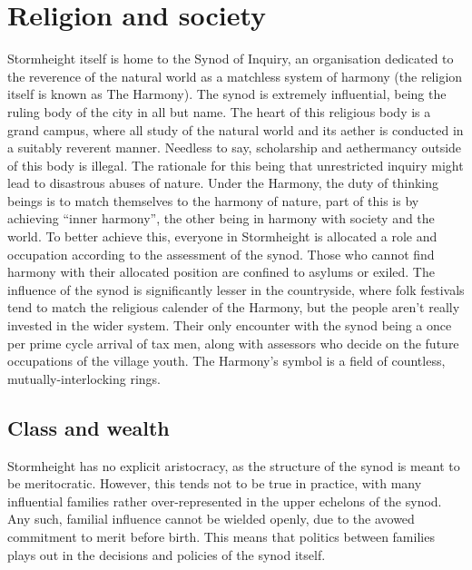 \documentclass[a4paper,11pt,oneside]{book}
\begin{document}
\section{Religion and society}
Stormheight itself is home to the Synod of Inquiry, an organisation dedicated to the reverence of the natural world as a matchless system of harmony (the religion itself is known as The Harmony). The synod is extremely influential, being the ruling body of the city in all but name. The heart of this religious body is a grand campus, where all study of the natural world and its aether is conducted in a suitably reverent manner. Needless to say, scholarship and aethermancy outside of this body is illegal. The rationale for this being that unrestricted inquiry might lead to disastrous abuses of nature. Under the Harmony, the duty of thinking beings is to match themselves to the harmony of nature, part of this is by achieving ``inner harmony'', the other being in harmony with society and the world. To better achieve this, everyone in Stormheight is allocated a role and occupation according to the assessment of the synod. Those who cannot find harmony with their allocated position are confined to asylums or exiled. The influence of the synod is significantly lesser in the countryside, where folk festivals tend to match the religious calender of the Harmony, but the people aren't really invested in the wider system. Their only encounter with the synod being a once per prime cycle arrival of tax men, along with assessors who decide on the future occupations of the village youth. The Harmony's symbol is a field of countless, mutually-interlocking rings.

\subsection{Class and wealth}
Stormheight has no explicit aristocracy, as the structure of the synod is meant to be meritocratic. However, this tends not to be true in practice, with many influential families rather over-represented in the upper echelons of the synod. Any such, familial influence cannot be wielded openly, due to the avowed commitment to merit before birth. This means that politics between families plays out in the decisions and policies of the synod itself. 
\end{document}
